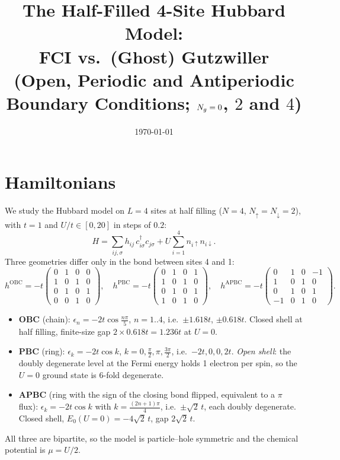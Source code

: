 \documentclass[11pt]{article}
\title{The Half-Filled 4-Site Hubbard Model:\\ FCI vs.\ (Ghost) Gutzwiller\\
\large (Open, Periodic and Antiperiodic Boundary Conditions; $N_{g}=0$, $2$ and $4$)}
\author{}
\date{\today}
\newcommand{\dg}{^{\dagger}}
\begin{document}
\maketitle
\tableofcontents

\section{Hamiltonians}
\label{sec:ham}

We study the Hubbard model on $L=4$ sites at half filling ($N=4$, $N_\uparrow=N_\downarrow=2$),
with $t=1$ and $U/t\in[0,20]$ in steps of $0.2$:
\begin{equation}
  H = \sum_{ij,\sigma} h_{ij}\, c\dg_{i\sigma} c_{j\sigma}
      + U\sum_{i=1}^{4} n_{i\uparrow} n_{i\downarrow}.
  \label{eq:H}
\end{equation}
Three geometries differ only in the bond between sites 4 and 1:
\begin{equation}
  h^{\mathrm{OBC}} = -t\begin{pmatrix} 0&1&0&0\\ 1&0&1&0\\ 0&1&0&1\\ 0&0&1&0\end{pmatrix},\quad
  h^{\mathrm{PBC}} = -t\begin{pmatrix} 0&1&0&1\\ 1&0&1&0\\ 0&1&0&1\\ 1&0&1&0\end{pmatrix},\quad
  h^{\mathrm{APBC}} = -t\begin{pmatrix} 0&1&0&-1\\ 1&0&1&0\\ 0&1&0&1\\ -1&0&1&0\end{pmatrix}.
\end{equation}
\begin{itemize}[nosep]
  \item \textbf{OBC} (chain): $\epsilon_n=-2t\cos\frac{n\pi}{5}$, $n=1..4$, i.e.\ $\pm1.618t$, $\pm0.618t$.
        Closed shell at half filling, finite-size gap $2\times0.618t=1.236t$ at $U=0$.
  \item \textbf{PBC} (ring): $\epsilon_k=-2t\cos k$, $k=0,\frac{\pi}{2},\pi,\frac{3\pi}{2}$, i.e.\ $-2t,0,0,2t$.
        \emph{Open shell}: the doubly degenerate level at the Fermi energy holds 1 electron per spin,
        so the $U=0$ ground state is 6-fold degenerate.
  \item \textbf{APBC} (ring with the sign of the closing bond flipped, equivalent to a $\pi$ flux):
        $\epsilon_k=-2t\cos k$ with $k=\frac{(2n+1)\pi}{4}$, i.e.\ $\pm\sqrt2\,t$, each doubly degenerate.
        Closed shell, $E_0(U=0)=-4\sqrt2\,t$, gap $2\sqrt2\,t$.
\end{itemize}
All three are bipartite, so the model is particle--hole symmetric and the chemical potential is
$\mu=U/2$.
\end{document}
